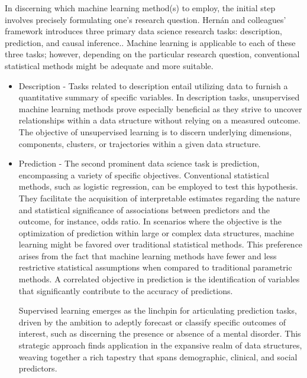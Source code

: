 In discerning which machine learning method(s) to employ, the initial step involves precisely formulating one's research question. Hernán and colleagues' framework introduces three primary data science research tasks: description, prediction, and causal inference.\cite{Hernan}. Machine learning is applicable to each of these three tasks; however, depending on the particular research question, conventional statistical methods might be adequate and more suitable.
\begin{itemize}
\item Description - Tasks related to description entail utilizing data to furnish a quantitative summary of specific variables. In description tasks, unsupervised machine learning methods prove especially beneficial as they strive to uncover relationships within a data structure without relying on a measured outcome. The objective of unsupervised learning is to discern underlying dimensions, components, clusters, or trajectories within a given data structure.

\item Prediction - The second prominent data science task is prediction, encompassing a variety of specific objectives. Conventional statistical methods, such as logistic regression, can be employed to test this hypothesis. They facilitate the acquisition of interpretable estimates regarding the nature and statistical significance of associations between predictors and the outcome, for instance, odds ratio. In scenarios where the objective is the optimization of prediction within large or complex data structures, machine learning might be favored over traditional statistical methods. This preference arises from the fact that machine learning methods have fewer and less restrictive statistical assumptions when compared to traditional parametric methods. A correlated objective in prediction is the identification of variables that significantly contribute to the accuracy of predictions.

Supervised learning emerges as the linchpin for articulating prediction tasks, driven by the ambition to adeptly forecast or classify specific outcomes of interest, such as discerning the presence or absence of a mental disorder. This strategic approach finds application in the expansive realm of data structures, weaving together a rich tapestry that spans demographic, clinical, and social predictors.


\end{itemize}
